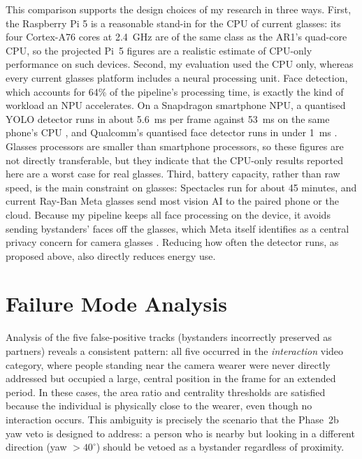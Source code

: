 This comparison supports the design choices of my research in three ways. First, the
Raspberry Pi 5 is a reasonable stand-in for the CPU of current glasses: its four
Cortex-A76 cores at 2.4~GHz are of the same class as the AR1's quad-core CPU, so
the projected Pi~5 figures are a realistic estimate of CPU-only performance on such
devices. Second, my evaluation used the CPU only, whereas every current glasses
platform includes a neural processing unit. Face detection, which accounts for 64\%
of the pipeline's processing time, is exactly the kind of workload an NPU
accelerates. On a Snapdragon smartphone NPU, a quantised YOLO detector runs in about
5.6~ms per frame against 53~ms on the same phone's CPU \citep{ref:ultralytics_qnn},
and Qualcomm's quantised face detector runs in under 1~ms \citep{ref:qcom_facedet}.
Glasses processors are smaller than smartphone processors, so these figures are not
directly transferable, but they indicate that the CPU-only results reported here are
a worst case for real glasses. Third, battery capacity, rather than raw speed, is
the main constraint on glasses: Spectacles run for about 45 minutes, and current
Ray-Ban Meta glasses send most vision AI to the paired phone or the cloud. Because
my pipeline keeps all face processing on the device, it avoids sending bystanders'
faces off the glasses, which Meta itself identifies as a central privacy concern for
camera glasses \citep{ref:meta_bystander}. Reducing how often the detector runs, as
proposed above, also directly reduces energy use.

\section{Failure Mode Analysis}
\label{sec:disc_failures}

Analysis of the five false-positive tracks (bystanders incorrectly preserved as
partners) reveals a consistent pattern: all five occurred in the \emph{interaction}
video category, where people standing near the camera wearer were never directly
addressed but occupied a large, central position in the frame for an extended
period. In these cases, the area ratio and centrality thresholds are satisfied
because the individual is physically close to the wearer, even though no interaction
occurs. This ambiguity is precisely the scenario that the Phase~2b yaw veto is
designed to address: a person who is nearby but looking in a different direction
(yaw $> 40^\circ$) should be vetoed as a bystander regardless of proximity.

